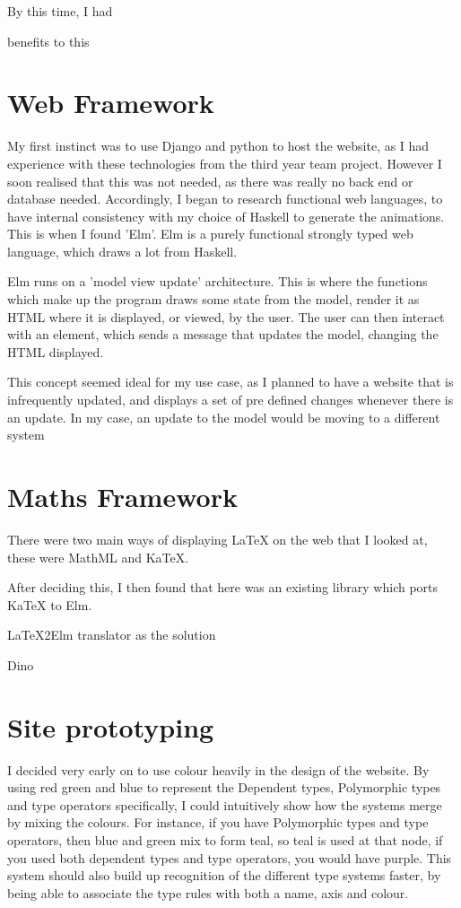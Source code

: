 \documentclass{l4proj}
\begin{document}
By this time, I had  

benefits to this

\section{Web Framework}

My first instinct was to use Django and python to host the website, as I had experience with these technologies from the third year team project.  However I soon realised that this was not needed, as there was really no back end or database needed.  Accordingly, I began to research functional web languages, to have internal consistency with my choice of Haskell to generate the animations.  This is when I found 'Elm'.  Elm is a purely functional strongly typed web language, which draws a lot from Haskell.

Elm runs on a 'model view update' architecture.  This is where the functions which make up the program draws some state from the model, render it as HTML where it is displayed, or viewed, by the user.  The user can then interact with an element, which sends a message that updates the model, changing the HTML displayed.

This concept seemed ideal for my use case, as I planned to have a website that is infrequently updated, and displays a set of pre defined changes whenever there is an update.  In my case, an update to the model would be moving to a different system

\section{Maths Framework}

There were two main ways of displaying LaTeX on the web that I looked at, these were MathML and KaTeX.

After deciding this, I then found that here was an existing library which ports KaTeX to Elm. 

LaTeX2Elm translator as the solution

Dino

\section{Site prototyping}

I decided very early on to use colour heavily in the design of the website.  By using red green and blue to represent the Dependent types, Polymorphic types and type operators specifically, I could intuitively show how the systems merge by mixing the colours.  For instance, if you have Polymorphic types and type operators, then blue and green mix to form teal, so teal is used at that node, if you used both dependent types and type operators, you would have purple.  This system should also build up recognition of the different type systems faster, by being able to associate the type rules with both a name, axis and colour.
\end{document}
